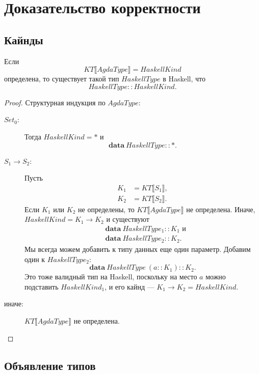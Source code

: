 \section{Доказательство корректности}\label{sec:appendix-proof}

\subsection{Кайнды}

\begin{thm}
Если
\[
KT\llbracket AgdaType \rrbracket = HaskellKind
\]
определена, то существует такой тип \(HaskellType\) в Haskell, что
\[
HaskellType :: HaskellKind.
\]
\end{thm}

\begin{proof}
Структурная индукция по \(AgdaType\):
\begin{description}
\item[\(Set_0\):] Тогда \(HaskellKind = *\) и
   \[
   \mathbf{data}\ HaskellType :: *.
   \]
\item[\(S_1 \rightarrow S_2\):] Пусть
   \begin{align*}
   K_1 &= KT\llbracket S_1 \rrbracket,\\
   K_2 &= KT\llbracket S_2 \rrbracket.
   \end{align*}
   Если \(K_1\) или \(K_2\) не определены, то \(KT\llbracket AgdaType \rrbracket\)
   не определена. Иначе, \(HaskellKind = K_1 \rightarrow K_2\) и существуют
   \begin{align*}
   &\mathbf{data}\ HaskellType_1 :: K_1\text{ и}\\
   &\mathbf{data}\ HaskellType_2 :: K_2.
   \end{align*}
   Мы всегда можем добавить к типу данных еще один параметр. Добавим один к
   \(HaskellType_2\):
   \[
   \mathbf{data}\ HaskellType\ (a :: K_1) :: K_2.
   \]
   Это тоже валидный тип на Haskell, поскольку на место \(a\) можно подставить
   \(HaskellKind_1\), и его кайнд --- \(K_1 \rightarrow K_2 = HaskellKind\).
\item[\textnormal{иначе}:] \(KT\llbracket AgdaType \rrbracket\) не определена.
\end{description}
\end{proof}

\subsection{Объявление типов}

